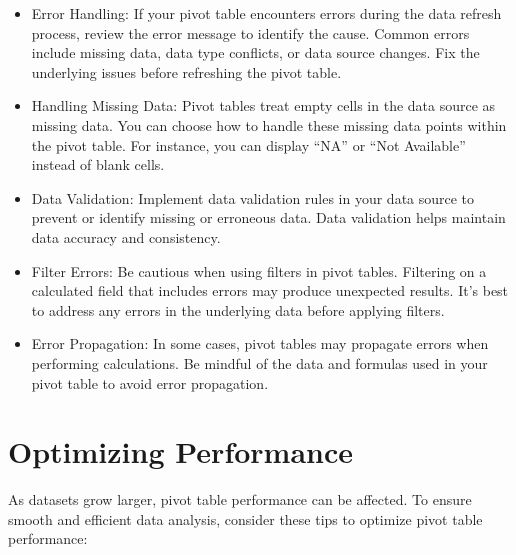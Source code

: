 \documentclass[
]{book}
\begin{document}
\begin{itemize}
\item
  Error Handling: If your pivot table encounters errors during the data refresh process, review the error message to identify the cause. Common errors include missing data, data type conflicts, or data source changes. Fix the underlying issues before refreshing the pivot table.
\item
  Handling Missing Data: Pivot tables treat empty cells in the data source as missing data. You can choose how to handle these missing data points within the pivot table. For instance, you can display ``NA'' or ``Not Available'' instead of blank cells.
\item
  Data Validation: Implement data validation rules in your data source to prevent or identify missing or erroneous data. Data validation helps maintain data accuracy and consistency.
\item
  Filter Errors: Be cautious when using filters in pivot tables. Filtering on a calculated field that includes errors may produce unexpected results. It's best to address any errors in the underlying data before applying filters.
\item
  Error Propagation: In some cases, pivot tables may propagate errors when performing calculations. Be mindful of the data and formulas used in your pivot table to avoid error propagation.
\end{itemize}

\hypertarget{optimizing-performance}{%
\section{Optimizing Performance}\label{optimizing-performance}}

As datasets grow larger, pivot table performance can be affected. To ensure smooth and efficient data analysis, consider these tips to optimize pivot table performance:
\end{document}
